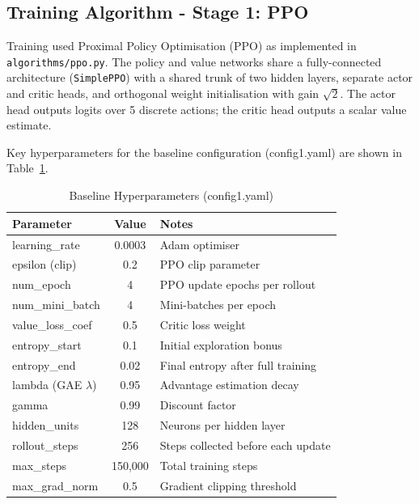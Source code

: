 \documentclass[../report.tex]{subfiles}
\begin{document}
    \subsection{Training Algorithm - Stage 1: PPO}

    Training used Proximal Policy Optimisation (PPO) as implemented in \texttt{algorithms/ppo.py}. The policy and value networks share a fully-connected architecture (\texttt{SimplePPO}) with a shared trunk of two hidden layers, separate actor and critic heads, and orthogonal weight initialisation with gain $\sqrt{2}$. The actor head outputs logits over 5 discrete actions; the critic head outputs a scalar value estimate.

    Key hyperparameters for the baseline configuration (config1.yaml) are shown in Table~\ref{tab:baseline}.

    \begin{table}[t]
        \centering
        \caption{Baseline Hyperparameters (config1.yaml)}
        \label{tab:baseline}
        \begin{tabular}{lcl}
            \toprule
            \textbf{Parameter} & \textbf{Value} & \textbf{Notes} \\
            \midrule
            learning\_rate & 0.0003 & Adam optimiser \\
            epsilon (clip) & 0.2 & PPO clip parameter \\
            num\_epoch & 4 & PPO update epochs per rollout \\
            num\_mini\_batch & 4 & Mini-batches per epoch \\
            value\_loss\_coef & 0.5 & Critic loss weight \\
            entropy\_start & 0.1 & Initial exploration bonus \\
            entropy\_end & 0.02 & Final entropy after full training \\
            lambda (GAE $\lambda$) & 0.95 & Advantage estimation decay \\
            gamma & 0.99 & Discount factor \\
            hidden\_units & 128 & Neurons per hidden layer \\
            rollout\_steps & 256 & Steps collected before each update \\
            max\_steps & 150,000 & Total training steps \\
            max\_grad\_norm & 0.5 & Gradient clipping threshold \\
            \bottomrule
        \end{tabular}
    \end{table}
\end{document}
